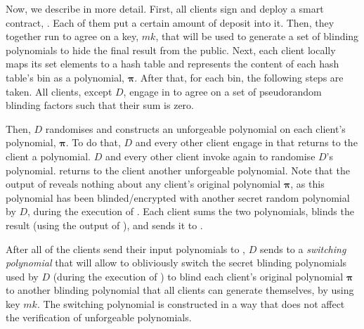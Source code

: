 %
%


Now, we describe \fpsi in more detail. First, all clients sign and deploy a  smart contract, \scf. Each of them put a certain amount of deposit into it. Then, they together run \ct to agree on a key, $mk$, that will be used to generate a set of blinding polynomials to hide the final result from the public. Next, each client locally maps its set elements to a hash table and represents the content of each hash table's bin as a polynomial, $\bm\pi$. After that, for each bin, the following steps are taken.  All clients, except $D$, engage in \zspaa to agree on a set of pseudorandom blinding factors such that their sum is zero.  %

Then, $D$ randomises and constructs an unforgeable polynomial on each client's polynomial, $\bm\pi$. To do that, $D$ and every other client engage in \vopr that returns to the client a polynomial. $D$ and every other client invoke \vopr again to randomise $D$'s polynomial. \vopr returns to the client another unforgeable polynomial. Note that the output of \vopr reveals nothing about any client's original polynomial $\bm\pi$, as this polynomial has been blinded/encrypted with another secret random polynomial by $D$, during the execution of \vopr. Each client sums the two polynomials,  blinds the result (using the output of  \zspaa), and sends it to \scf. 



After all of the clients send their input polynomials to \scf, $D$ sends to \scf a \emph{switching polynomial} that will allow \scf to obliviously switch the secret blinding polynomials used by $D$ (during the execution of \vopr) to blind each client's original polynomial $\bm\pi$  to another blinding polynomial that all clients can generate themselves, by using key $mk$.  The switching polynomial is constructed in a way that does not affect the verification of unforgeable polynomials. 




